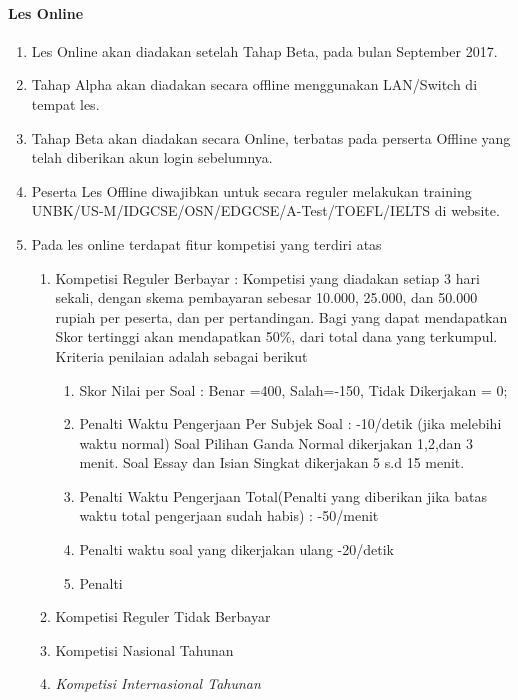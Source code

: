 \documentclass[12pt,a4paper]{article}
\begin{document}
	\paragraph{\textbf{Les Online}}
		\begin{enumerate}
			\item Les Online akan diadakan setelah Tahap Beta, pada bulan September 2017.
			\item Tahap Alpha akan diadakan secara offline menggunakan LAN/Switch di tempat les.
			\item Tahap Beta akan diadakan secara Online, terbatas pada perserta Offline yang telah diberikan akun login sebelumnya.
			\item Peserta Les Offline diwajibkan untuk secara reguler melakukan training UNBK/US-M/IDGCSE/OSN/EDGCSE/A-Test/TOEFL/IELTS di website.
			\item Pada les online terdapat fitur kompetisi yang terdiri atas
				\begin{enumerate}
					\item Kompetisi Reguler Berbayar : Kompetisi yang diadakan setiap 3 hari sekali, dengan skema pembayaran sebesar 10.000, 25.000, dan 50.000 rupiah per peserta, dan per pertandingan. Bagi yang dapat mendapatkan Skor tertinggi akan mendapatkan 50\%, dari total dana yang terkumpul.
					Kriteria penilaian adalah sebagai berikut 
					\begin{enumerate}
						\item Skor Nilai per Soal : Benar =400, Salah=-150, Tidak Dikerjakan = 0;
						\item Penalti Waktu Pengerjaan Per Subjek Soal	: -10/detik (jika melebihi waktu normal)
						Soal Pilihan Ganda Normal dikerjakan 1,2,dan 3 menit.
						Soal Essay dan Isian Singkat dikerjakan 5 s.d 15 menit. 
						\item Penalti Waktu Pengerjaan Total(Penalti yang diberikan jika batas waktu total pengerjaan sudah habis) : -50/menit
						\item Penalti waktu soal yang dikerjakan ulang -20/detik
						\item Penalti  
						
						
					\end{enumerate}
					
					\item Kompetisi Reguler Tidak
					 Berbayar
					\item Kompetisi Nasional Tahunan
					\item \textit{Kompetisi Internasional Tahunan}
				\end{enumerate}
			
			
			
			
		\end{enumerate}
\end{document}
